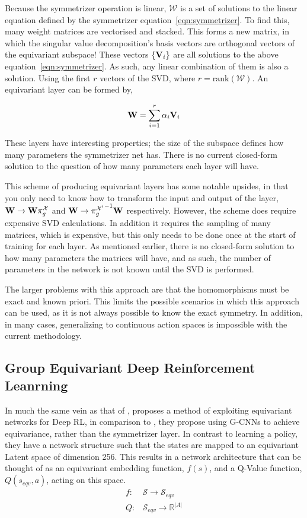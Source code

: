 Because the symmetrizer operation is linear, $\mathcal{W}$ is a set of solutions to the linear equation defined by the symmetrizer equation~\ref{eqn:symmetrizer}. To find this, many weight matrices are vectorised and stacked. This forms a new matrix, in which the singular value decomposition's basis vectors are orthogonal vectors of the equivariant subspace! These vectors $\{\mathbf{V}_i\}$ are all solutions to the above equation~\ref{eqn:symmetrizer}. As such, any linear combination of them is also a solution. Using the first $r$ vectors of the SVD, where $r= \text{rank}(\mathcal{W})$. An equivariant layer can be formed by,

\begin{equation}
	\mathbf{W} = \sum_{i=1}^{r}{\alpha_i\mathbf{V}_i}
\end{equation}

These layers have interesting properties; the size of the subspace defines how many parameters the symmetrizer net has. There is no current closed-form solution to the question of how many parameters each layer will have.

This scheme of producing equivariant layers has some notable upsides, in that you only need to know how to transform the input and output of the layer, $\mathbf{W} \rightarrow \mathbf{W}\pi_g^\mathcal{X}$ and $\mathbf{W} \rightarrow {\pi_g^{\mathcal{X}'}}^{-1} \mathbf{W}$ respectively. However, the scheme does require expensive SVD calculations. In addition it requires the sampling of many matrices, which is expensive, but this only needs to be done once at the start of training for each layer. As mentioned earlier, there is no closed-form solution to how many parameters the matrices will have, and as such, the number of parameters in the network is not known until the SVD is performed.

The larger problems with this approach are that the homomorphisms must be exact and known priori. This limits the possible scenarios in which this approach can be used, as it is not always possible to know the exact symmetry. In addition, in many cases, generalizing to continuous action spaces is impossible with the current methodology.


\subsection{Group Equivariant Deep Reinforcement Leanrning}
In much the same vein as that of \cite{vanderpol2020mdp}, \cite{mondal2020group} proposes a method of exploiting equivariant networks for Deep RL, in comparison to \cite{vanderpol2020mdp}, they propose using G-CNNs \cite{cohen2016group} to achieve equivariance, rather than the symmetrizer layer. In contrast to learning a policy, they have a network structure such that the states are mapped to an equivariant Latent space of dimension 256. This results in a network architecture that can be thought of as an equivariant embedding function, $f(s)$, and a Q-Value function, $Q(s_{eqv}, a)$, acting on this space.
\begin{align}
	f: & \mathcal{S} \rightarrow \mathcal{S}_{eqv}      \\
	Q: & \mathcal{S}_{eqv} \rightarrow \mathbb{R}^{|A|}
\end{align}

